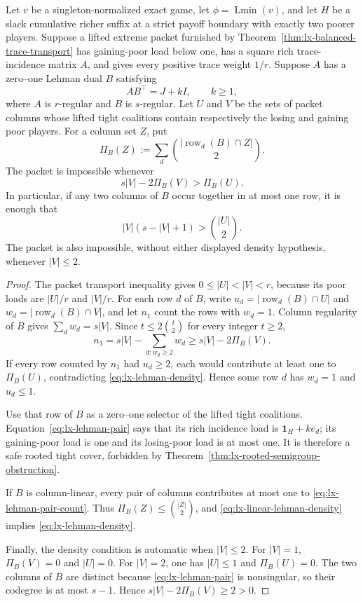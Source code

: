 \begin{theorem}
\label{thm:lx-positive-lehman-trace-exclusion}
Let $v$ be a singleton-normalized exact game, let
$\phi=\operatorname{Lmin}(v)$, and let $H$ be a slack cumulative richer
suffix at a strict payoff boundary with exactly two poorer players.  Suppose
a lifted extreme packet furnished by
Theorem~\ref{thm:lx-balanced-trace-transport} has gaining-poor load below
one, has a square rich trace-incidence matrix $A$, and gives every positive
trace weight $1/r$.  Suppose $A$ has a zero--one Lehman dual $B$ satisfying
\[
 AB^\top=J+kI,\qquad k\geq1,                        \tag{LH}
 \label{eq:lx-lehman-pair}
\]
where $A$ is $r$-regular and $B$ is $s$-regular.  Let $U$ and $V$ be the
sets of packet columns whose lifted tight coalitions contain respectively
the losing and gaining poor players.  For a column set $Z$, put
\[
 \Pi_B(Z):=\sum_{d}\binom{|\operatorname{row}_d(B)\cap Z|}{2}.
 \tag{LH-P}\label{eq:lx-lehman-pair-count}
\]
The packet is impossible whenever
\[
 s|V|-2\Pi_B(V)>\Pi_B(U).                            \tag{LH-D}
 \label{eq:lx-lehman-density}
\]
In particular, if any two columns of $B$ occur together in at most one row,
it is enough that
\[
 |V|(s-|V|+1)>\binom{|U|}{2}.                        \tag{LH-L}
 \label{eq:lx-linear-lehman-density}
\]
The packet is also impossible, without either displayed density hypothesis,
whenever $|V|\leq2$.
\end{theorem}

\begin{proof}
The packet transport inequality gives
$0\leq |U|<|V|<r$, because its poor loads are $|U|/r$ and $|V|/r$.
For each row $d$ of $B$, write
$u_d=|\operatorname{row}_d(B)\cap U|$ and
$w_d=|\operatorname{row}_d(B)\cap V|$, and let $n_1$ count the rows with
$w_d=1$.  Column regularity of $B$ gives $\sum_dw_d=s|V|$.  Since
$t\leq2\binom t2$ for every integer $t\geq2$,
\[
 n_1=s|V|-\sum_{d:w_d\geq2}w_d
 \geq s|V|-2\Pi_B(V).                               \tag{LH-1}
 \label{eq:lx-lehman-simple-rows}
\]
If every row counted by $n_1$ had $u_d\geq2$, each would contribute at least
one to $\Pi_B(U)$, contradicting
\eqref{eq:lx-lehman-density}.  Hence some row $d$ has
$w_d=1$ and $u_d\leq1$.

Use that row of $B$ as a zero--one selector of the lifted tight coalitions.
Equation~\eqref{eq:lx-lehman-pair} says that its rich incidence load is
$\mathbf1_H+k e_d$; its gaining-poor load is one and its losing-poor load is
at most one.  It is therefore a safe rooted tight cover, forbidden by
Theorem~\ref{thm:lx-rooted-semigroup-obstruction}.

If $B$ is column-linear, every pair of columns contributes at most one to
\eqref{eq:lx-lehman-pair-count}.  Thus
$\Pi_B(Z)\leq\binom{|Z|}{2}$, and
\eqref{eq:lx-linear-lehman-density} implies
\eqref{eq:lx-lehman-density}.

Finally, the density condition is automatic when $|V|\leq2$.  For
$|V|=1$, $\Pi_B(V)=0$ and $|U|=0$.  For $|V|=2$, one has $|U|\leq1$ and
$\Pi_B(U)=0$.  The two columns of $B$ are distinct because
\eqref{eq:lx-lehman-pair} is nonsingular, so their codegree is at most
$s-1$.  Hence
$s|V|-2\Pi_B(V)\geq2>0$.
\end{proof}

